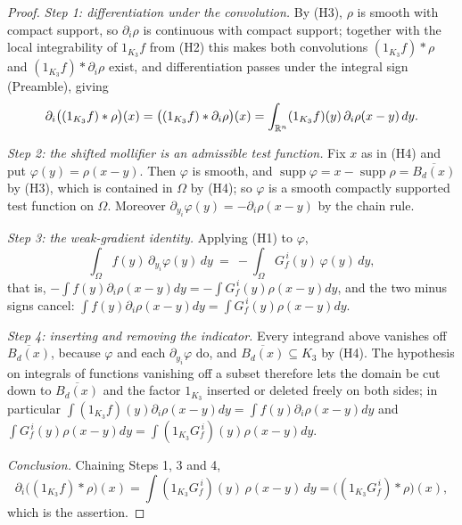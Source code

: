 \begin{proof}
\emph{Step 1: differentiation under the convolution.}  By (H3), $\rho$ is
smooth with compact support, so $\partial_i\rho$ is continuous with compact
support; together with the local integrability of $1_{K_3}f$ from (H2) this
makes both convolutions $(1_{K_3}f)*\rho$ and $(1_{K_3}f)*\partial_i\rho$ exist,
and differentiation passes under the integral sign (Preamble), giving
\[
\partial_i\bigl((1_{K_3}f)*\rho\bigr)(x)
=\bigl((1_{K_3}f)*\partial_i\rho\bigr)(x)
=\int_{\mathbb{R}^n}(1_{K_3}f)(y)\,\partial_i\rho(x-y)\,dy .
\]

\emph{Step 2: the shifted mollifier is an admissible test function.}  Fix $x$
as in (H4) and put $\varphi(y)=\rho(x-y)$.  Then $\varphi$ is smooth, and
$\operatorname{supp}\varphi=x-\operatorname{supp}\rho=\overline{B_d(x)}$ by
(H3), which is contained in $\Omega$ by (H4); so $\varphi$ is a smooth
compactly supported test function on $\Omega$.  Moreover
$\partial_{y_i}\varphi(y)=-\partial_i\rho(x-y)$ by the chain rule.

\emph{Step 3: the weak-gradient identity.}  Applying (H1) to $\varphi$,
\[
\int_{\Omega}f(y)\,\partial_{y_i}\varphi(y)\,dy
\ =\ -\int_{\Omega}G_f^{\,i}(y)\,\varphi(y)\,dy ,
\]
that is, $-\int f(y)\partial_i\rho(x-y)dy=-\int G_f^{\,i}(y)\rho(x-y)dy$, and
the two minus signs cancel:
$\int f(y)\partial_i\rho(x-y)dy=\int G_f^{\,i}(y)\rho(x-y)dy$.

\emph{Step 4: inserting and removing the indicator.}  Every integrand above
vanishes off $\overline{B_d(x)}$, because $\varphi$ and each
$\partial_{y_i}\varphi$ do, and $\overline{B_d(x)}\subseteq K_3$ by (H4).  The
hypothesis on integrals of functions vanishing off a subset therefore lets the
domain be cut down to $\overline{B_d(x)}$ and the factor $1_{K_3}$ inserted or
deleted freely on both sides; in particular
$\int(1_{K_3}f)(y)\partial_i\rho(x-y)dy=\int f(y)\partial_i\rho(x-y)dy$ and
$\int G_f^{\,i}(y)\rho(x-y)dy=\int(1_{K_3}G_f^{\,i})(y)\rho(x-y)dy$.

\emph{Conclusion.}  Chaining Steps 1, 3 and 4,
\[
\partial_i\bigl((1_{K_3}f)*\rho\bigr)(x)
=\int(1_{K_3}G_f^{\,i})(y)\,\rho(x-y)\,dy
=\bigl((1_{K_3}G_f^{\,i})*\rho\bigr)(x),
\]
which is the assertion.
\end{proof}
